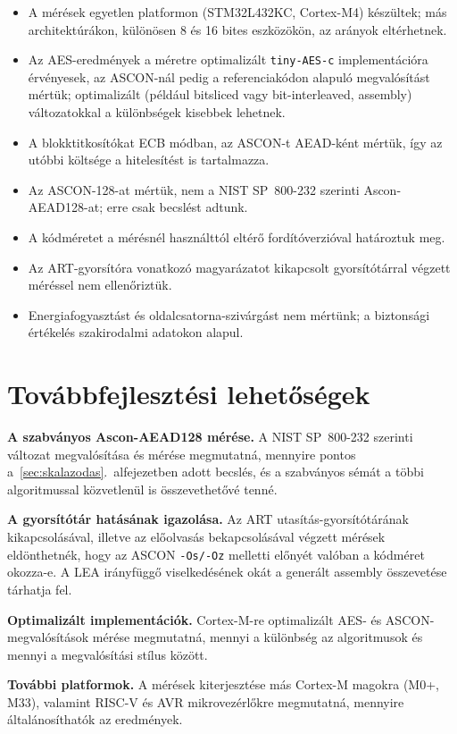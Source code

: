 \documentclass[a4paper,12pt]{report}
\theoremstyle{definition}
\theoremstyle{remark}
\begin{document}
\begin{itemize}
	\item A mérések egyetlen platformon (STM32L432KC, Cortex-M4) készültek; más architektúrákon, különösen 8 és 16 bites eszközökön, az arányok eltérhetnek.
	\item Az AES-eredmények a méretre optimalizált \texttt{tiny-AES-c} implementációra érvényesek, az ASCON-nál pedig a referenciakódon alapuló megvalósítást mértük; optimalizált (például bitsliced vagy bit-interleaved, assembly) változatokkal a különbségek kisebbek lehetnek.
	\item A blokktitkosítókat ECB módban, az ASCON-t AEAD-ként mértük, így az utóbbi költsége a hitelesítést is tartalmazza.
	\item Az ASCON-128-at mértük, nem a NIST SP~800-232 szerinti Ascon-AEAD128-at; erre csak becslést adtunk.
	\item A kódméretet a mérésnél használttól eltérő fordítóverzióval határoztuk meg.
	\item Az ART-gyorsítóra vonatkozó magyarázatot kikapcsolt gyorsítótárral végzett méréssel nem ellenőriztük.
	\item Energiafogyasztást és oldalcsatorna-szivárgást nem mértünk; a biztonsági értékelés szakirodalmi adatokon alapul.
\end{itemize}

\section{Továbbfejlesztési lehetőségek}\label{sec:tovabbfejlesztes}

\textbf{A szabványos Ascon-AEAD128 mérése.} A NIST SP~800-232 szerinti változat megvalósítása és mérése megmutatná, mennyire pontos a~\ref{sec:skalazodas}.~alfejezetben adott becslés, és a szabványos sémát a többi algoritmussal közvetlenül is összevethetővé tenné.

\textbf{A gyorsítótár hatásának igazolása.} Az ART utasítás-gyorsítótárának kikapcsolásával, illetve az előolvasás bekapcsolásával végzett mérések eldönthetnék, hogy az ASCON \texttt{-Os/-Oz} melletti előnyét valóban a kódméret okozza-e. A LEA irányfüggő viselkedésének okát a generált assembly összevetése tárhatja fel.

\textbf{Optimalizált implementációk.} Cortex-M-re optimalizált AES- és ASCON-megvalósítások mérése megmutatná, mennyi a különbség az algoritmusok és mennyi a megvalósítási stílus között.

\textbf{További platformok.} A mérések kiterjesztése más Cortex-M magokra (M0+, M33), valamint RISC-V és AVR mikrovezérlőkre megmutatná, mennyire általánosíthatók az eredmények.
\end{document}
